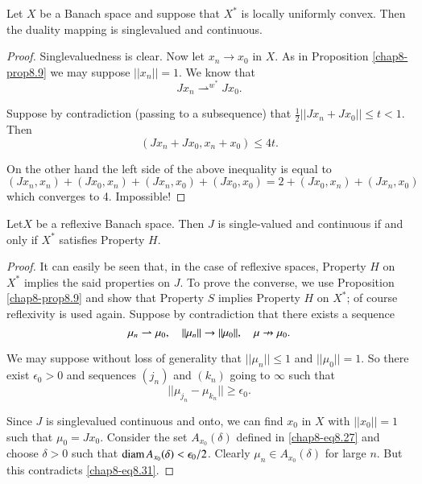 \begin{proposition}\label{chap8-prop8.10}
Let $X$ be a Banach space and suppose that $X^{*}$ is locally
uniformly convex. Then the duality mapping is singlevalued and
continuous. 
\end{proposition}

\begin{proof}
Singlevaluedness is clear. Now let $x_{n}\to x_{0}$ in $X$. As in
Proposition \ref{chap8-prop8.9} we may suppose $||x_{n}||=1$. We know
that
$$
Jx_{n}\displaystyle{\mathop{\rightharpoonup}^{w^{*}}}Jx_{0}.
$$

Suppose by contradiction (passing to a subsequence) that
$\frac{1}{2}||Jx_{n}+Jx_{0}||\leq t<1$. Then 
$$
(Jx_{n}+Jx_{0},x_{n}+x_{0})\leq 4t.
$$

On the other hand the left side of the above inequality is equal to
$$
(Jx_{n},x_{n})+(Jx_{0},x_{n})+(Jx_{n},x_{0})+(Jx_{0},x_{0})=2+(Jx_{0},x_{n})+(Jx_{n},x_{0}) 
$$ 
which converges to 4. Impossible!
\end{proof}

\begin{proposition}\label{chap8-prop8.11}
Let\pageoriginale $X$ be a reflexive Banach space. Then $J$ is
single-valued and continuous if and only if $X^{*}$ satisfies Property
$H$. 
\end{proposition}

\begin{proof}
It can easily be seen that, in the case of reflexive spaces, Property
$H$ on $X^{*}$ implies the said properties on $J$. To prove the
converse, we use Proposition \ref{chap8-prop8.9} and show that
Property $S$ implies Property $H$ on $X^{*}$; of course reflexivity is
used again. Suppose by contradiction that there exists a sequence
$$
\mu_{n}\rightharpoonup \mu_{0},\quad ||\mu_{n}||\to ||\mu_{0}||,\quad
\mu\nrightarrow \mu_{0}.
$$

We may suppose without loss of generality that $||\mu_{n}||\leq 1$ and
$||\mu_{0}||=1$. So there exist $\epsilon_{0}>0$ and sequences
$(j_{n})$ and $(k_{n})$ going to $\infty$ such that
\begin{equation*}
||\mu_{j_{n}}-\mu_{k_{n}}||\geq
\epsilon_{0}.\tag{8.31}\label{chap8-eq8.31} 
\end{equation*}

Since $J$ is singlevalued continuous and onto, we can find $x_{0}$ in
$X$ with $||x_{0}||=1$ such that $\mu_{0}=Jx_{0}$. Consider the set
$A_{x_{0}}(\delta)$ defined in \eqref{chap8-eq8.27} and choose
$\delta>0$ such that $\operatorname{diam} A_{x_{0}}(\delta)<\epsilon_{0}/2$. Clearly
$\mu_{n}\in A_{x_{0}}(\delta)$ for large $n$. But this contradicts
\eqref{chap8-eq8.31}. 
\end{proof}

